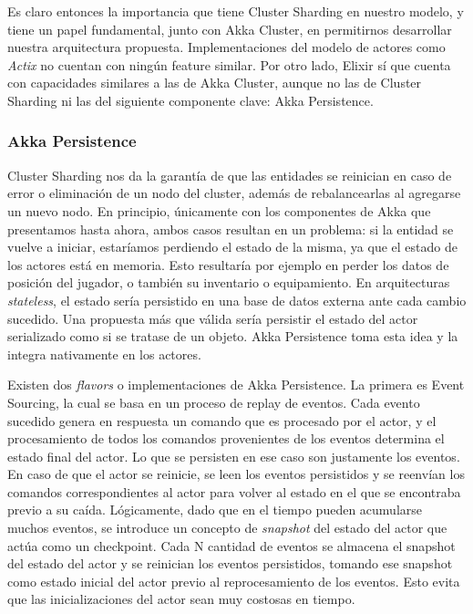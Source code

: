 Es claro entonces la importancia que tiene Cluster Sharding en nuestro modelo, y tiene un papel fundamental, junto con Akka Cluster, en permitirnos desarrollar nuestra arquitectura
propuesta. Implementaciones del modelo de actores como \textit{Actix} no cuentan con ningún feature similar. Por otro lado, Elixir sí que cuenta con capacidades similares a las de Akka
Cluster, aunque no las de Cluster Sharding ni las del siguiente componente clave: Akka Persistence.

\subsubsection{Akka Persistence}

\noindent Cluster Sharding nos da la garantía de que las entidades se reinician en caso de error o eliminación de un nodo del cluster, además de rebalancearlas al agregarse un nuevo
nodo. En principio, únicamente con los componentes de Akka que presentamos hasta ahora, ambos casos resultan en un problema: si la entidad se vuelve a iniciar, estaríamos perdiendo el estado
de la misma, ya que el estado de los actores está en memoria. Esto resultaría por ejemplo en perder los datos de posición del jugador, o también su inventario o equipamiento.
En arquitecturas \textit{stateless}, el estado sería persistido en una base de datos externa ante cada cambio sucedido.
Una propuesta más que válida sería persistir el estado del actor serializado como si se tratase de un objeto. Akka Persistence toma esta idea y la integra nativamente en los actores. 

Existen dos \textit{flavors} o implementaciones de Akka Persistence. La primera es Event Sourcing, la cual se basa en un proceso de replay de eventos. Cada evento sucedido genera en respuesta
un comando que es procesado por el actor, y el procesamiento de todos los comandos provenientes de los eventos determina el estado final del actor. Lo que se persisten en ese caso son justamente los eventos.
En caso de que el actor se reinicie, se leen los eventos persistidos y se reenvían los comandos correspondientes al actor para volver al estado en el que se encontraba previo a su caída.
Lógicamente, dado que en el tiempo pueden acumularse muchos eventos, se introduce un concepto de \textit{snapshot} del estado del actor que actúa como un checkpoint. Cada N cantidad de eventos
se almacena el snapshot del estado del actor y se reinician los eventos persistidos, tomando ese snapshot como estado inicial del actor previo al reprocesamiento de los eventos. Esto evita que las inicializaciones
del actor sean muy costosas en tiempo.

